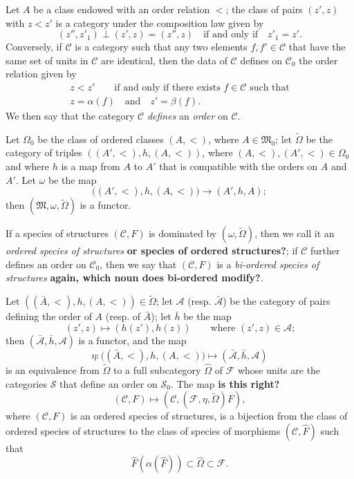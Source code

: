\documentclass[a4paper,fleqn]{article}
\theoremstyle{plain}
\theoremstyle{definition}
\newenvironment{definition}[1]
  {\renewcommand\theinnerdefinition{#1}\innerdefinition}
  {\endinnerdefinition}
\newcommand{\oldpage}[1]{{\marginpar{\footnotesize$\bigg\vert$\,\,\,\,\textit{p.~#1}}}}
\newcommand{\unsure}[1]{{\color{purple}\textbf{#1}}}
\newcommand{\textand}{\quad\text{and}\quad}
\newcommand{\CC}{\mathcal{C}}
\renewcommand{\SS}{\mathcal{S}}
\newcommand{\MM}{\mathfrak{M}}
\newcommand{\FF}{\mathcal{F}}
\renewcommand{\AA}{\mathcal{A}}
\begin{document}
Let $A$ be a class endowed with an order relation $<$;
the class of pairs $(z',z)$ with $z<z'$ is a category under the composition law given by
\[
  (z'',z'_1)\perp(z',z)
  =(z'',z)
  \quad\text{if and only if}\quad
  z'_1=z'.
\]
\oldpage{356}
Conversely, if $\CC$ is a category such that any two elements $f,f'\in\CC$ that have the same set of units in $\CC$ are identical, then the data of $\CC$ defines on $\CC_0$ the order relation given by
\[
  \begin{gathered}
    z<z'
    \qquad\text{if and only if there exists $f\in\CC$ such that}
  \\z=\alpha(f)
    \textand
    z'=\beta(f).
  \end{gathered}
\]
We then say that the category $\CC$ \emph{defines} an \emph{order} on $\CC$.

Let $\Omega_0$ be the class of ordered classes $(A,<)$, where $A\in\MM_0$;
let $\widetilde{\Omega}$ be the category of triples $((A',<),h,(A,<))$, where $(A,<),(A',<)\in\Omega_0$ and where $h$ is a map from $A$ to $A'$ that is compatible with the orders on $A$ and $A'$.
Let $\omega$ be the map
\[
  \big((A',<),h,(A,<)\big)
  \longrightarrow (A',h,A);
\]
then $(\MM,\omega,\widetilde{\Omega})$ is a functor.

\begin{definition}{5}
\label{definition:i-5}
  If a species of structures $(\CC,F)$ is dominated by $(\omega,\widetilde{\Omega})$, then we call it an \emph{ordered species of structures} \unsure{or species of ordered structures?};
  if $\CC$ further defines an order on $\CC_0$, then we say that $(\CC,F)$ is a \emph{bi-ordered species of structures} \unsure{again, which noun does bi-ordered modify?}.
\end{definition}

Let $((\bar{A},<),h,(A,<))\in\widetilde{\Omega}$;
let $\AA$ (resp. $\bar{\AA}$) be the category of pairs defining the order of $A$ (resp. of $\bar{A}$);
let $\bar{h}$ be the map
\[
  (z',z)
  \longmapsto(h(z'),h(z))
  \qquad\text{where $(z',z)\in\AA$;}
\]
then $(\bar{\AA},\bar{h},\AA)$ is a functor, and the map
\[
  \eta\colon\big((\bar{A},<),h,(A,<)\big)
  \longmapsto(\bar{\AA},\bar{h},\AA)
\]
is an equivalence from $\widetilde{\Omega}$ to a full subcategory $\widehat{\Omega}$ of $\FF$ whose units are the categories $\SS$ that define an order on $\SS_0$.
The map \unsure{is this right?}
\[
  (\CC,F)
  \longmapsto (\CC,(\FF,\eta,\widetilde{\Omega})F),
\]
where $(\CC,F)$ is an ordered species of structures, is a bijection from the class of ordered species of structures to the class of species of morphisms $(\CC,\widehat{F})$ such that
\[
  \widehat{F}(\alpha(\widehat{F}))
  \subset \widehat{\Omega}
  \subset \FF.
\]
\end{document}
